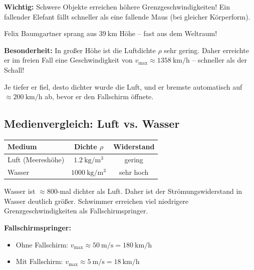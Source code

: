 \documentclass[11pt, a4paper]{article}
\begin{document}
\begin{warnbox}
\textbf{Wichtig:} Schwere Objekte erreichen höhere Grenzgeschwindigkeiten! Ein fallender Elefant fällt schneller als eine fallende Maus (bei gleicher Körperform).
\end{warnbox}

\begin{beispielbox}[title=Red Bull Stratos (2012)]
Felix Baumgartner sprang aus $\SI{39}{\kilo\metre}$ Höhe -- fast aus dem Weltraum!

\textbf{Besonderheit:} In großer Höhe ist die Luftdichte $\rho$ sehr gering. Daher erreichte er im freien Fall eine Geschwindigkeit von $v_{\text{max}} \approx \SI{1358}{\kilo\metre\per\hour}$ -- schneller als der Schall!

Je tiefer er fiel, desto dichter wurde die Luft, und er bremste automatisch auf $\approx \SI{200}{\kilo\metre\per\hour}$ ab, bevor er den Fallschirm öffnete.
\end{beispielbox}

\subsection{Medienvergleich: Luft vs. Wasser}

\begin{center}
\begin{tabular}{|l|c|c|}
\hline
\textbf{Medium} & \textbf{Dichte $\rho$} & \textbf{Widerstand} \\
\hline
Luft (Meereshöhe) & $\SI{1,2}{\kilo\gram\per\metre\cubed}$ & gering \\
Wasser & $\SI{1000}{\kilo\gram\per\metre\cubed}$ & sehr hoch \\
\hline
\end{tabular}
\end{center}

\begin{merksatz}
Wasser ist $\approx 800$-mal dichter als Luft. Daher ist der Strömungswiderstand in Wasser deutlich größer. Schwimmer erreichen viel niedrigere Grenzgeschwindigkeiten als Fallschirmspringer.
\end{merksatz}

\begin{beispielbox}
\textbf{Fallschirmspringer:}
\begin{itemize}[leftmargin=1em]
    \item Ohne Fallschirm: $v_{\text{max}} \approx \SI{50}{\metre\per\second} = \SI{180}{\kilo\metre\per\hour}$
    \item Mit Fallschirm: $v_{\text{max}} \approx \SI{5}{\metre\per\second} = \SI{18}{\kilo\metre\per\hour}$
\end{itemize}
\end{beispielbox}
\end{document}
